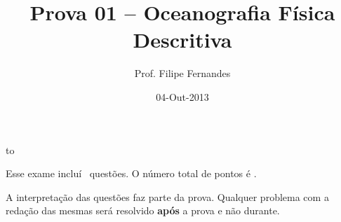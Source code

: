 \documentclass[letterpaper,portuguese,12pt,pdftex]{exam}
\title{Prova 01 -- Oceanografia Física Descritiva}
\author{Prof. Filipe Fernandes}
\date{04-Out-2013}
\begin{document}
\maketitle
\doublespacing

\vspace{1cm}
\hbox to \textwidth{Nome e número de matrícula:\enspace\hrulefill}
\vspace{1cm}

\begin{minipage}{.8\textwidth}
Esse exame incluí \numquestions\ questões. O número total de pontos é
\numpoints.  %

A interpretação das questões faz parte da prova.  Qualquer problema com a
redação das mesmas será resolvido {\bf após} a prova e não durante.

\end{minipage}
\vspace{0.5cm}
\end{document}
